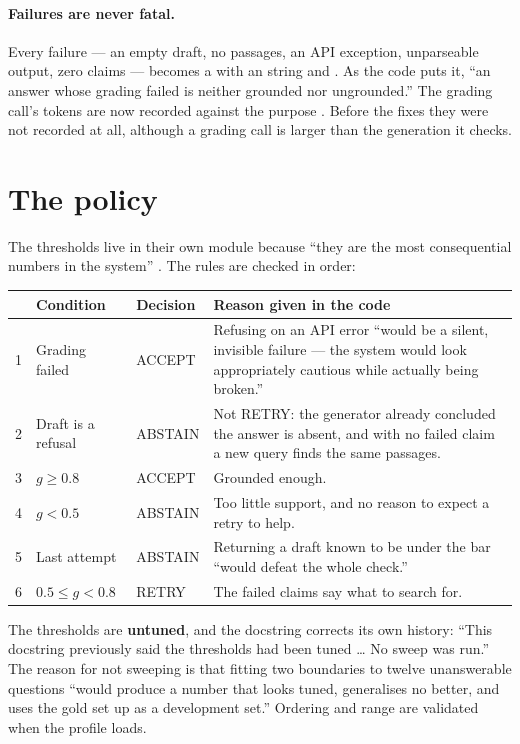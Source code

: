 \paragraph{Failures are never fatal.} Every failure --- an empty draft, no passages, an API exception, unparseable output, zero claims --- becomes a  with an  string and . As the code puts it, ``an answer whose grading failed is neither grounded nor ungrounded.'' The grading call's tokens are now recorded against the purpose . Before the fixes they were not recorded at all, although a grading call is larger than the generation it checks.

\section{The policy}

The thresholds live in their own module because ``they are the most consequential numbers in the system'' . The rules are checked in order:

\begin{center}\small
\begin{tabularx}{\textwidth}{@{}c>{\raggedright\arraybackslash}p{3.8cm}>{\raggedright\arraybackslash}p{1.7cm}L@{}}
\toprule
& \textbf{Condition} & \textbf{Decision} & \textbf{Reason given in the code}\\
 & Grading failed & ACCEPT & Refusing on an API error ``would be a silent, invisible failure --- the system would look appropriately cautious while actually being broken.''\\
2 & Draft is a refusal & ABSTAIN & Not RETRY: the generator already concluded the answer is absent, and with no failed claim a new query finds the same passages.\\
3 & $g\ge0.8$ & ACCEPT & Grounded enough.\\
4 & $g<0.5$ & ABSTAIN & Too little support, and no reason to expect a retry to help.\\
5 & Last attempt & ABSTAIN & Returning a draft known to be under the bar ``would defeat the whole check.''\\
6 & $0.5\le g<0.8$ & RETRY & The failed claims say what to search for.\\
\bottomrule
\end{tabularx}
\end{center}

The thresholds are \textbf{untuned}, and the docstring corrects its own history: ``This docstring previously said the thresholds had been tuned \ldots{} No sweep was run.'' The reason for not sweeping is that fitting two boundaries to twelve unanswerable questions ``would produce a number that looks tuned, generalises no better, and uses the gold set up as a development set.'' Ordering and range are validated when the profile loads.

